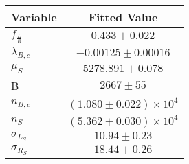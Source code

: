 \begin{tabular}[t]{lc}
\hline
Variable &Fitted Value\\
\hline\hline
$f_{\frac{L}{R}}$&$0.433\pm0.022$\\
\hline
$\lambda_{B,c}$&$-0.00125\pm0.00016$\\
\hline
$\mu_S$&$5278.891\pm0.078$\\
\hline
B&$2667\pm55$\\
\hline
$n_{B,c}$&$(1.080\pm0.022)\times 10^4$\\
\hline
$n_S$&$(5.362\pm0.030)\times 10^4$\\
\hline
$\sigma_{L_S}$&$10.94\pm0.23$\\
\hline
$\sigma_{R_S}$&$18.44\pm0.26$\\
\hline
\end{tabular}
